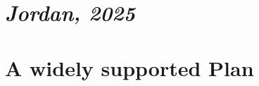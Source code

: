 \documentclass[a5paper,english,openany]{memoir}
\begin{document}

\chapter*{\textit{Jordan, 2025}}\label{ch:narr_vancouver} 

\chapter{A widely supported Plan\label{ch:soutien}}
\end{document}
